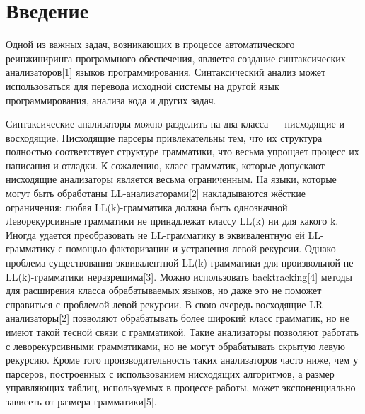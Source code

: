 \documentclass{matmex-diploma-custom}
\begin{document}
\maketitle
\section*{Введение}
Одной из важных задач, возникающих в процессе автоматического реинжиниринга программного обеспечения, является создание синтаксических анализаторов[1] языков программирования. Синтаксический анализ может использоваться для перевода исходной системы на другой язык программирования, анализа кода и других задач.

Синтаксические анализаторы можно разделить на два класса — нисходящие и восходящие. Нисходящие парсеры привлекательны тем, что их структура полностью соответствует структуре грамматики, что весьма упрощает процесс их написания и отладки. К сожалению, класс грамматик, которые допускают нисходящие анализаторы является весьма ограниченным. На языки, которые могут быть обработаны LL-анализаторами[2] накладываются жёсткие ограничения: любая LL(k)-грамматика должна быть однозначной. Леворекурсивные  грамматики не принадлежат классу LL(k) ни для  какого  k. Иногда удается преобразовать не LL-грамматику в эквивалентную ей LL-грамматику с  помощью факторизации  и устранения левой рекурсии. Однако  проблема  существования эквивалентной LL(k)-грамматики для произвольной  не LL(k)-грамматики неразрешима[3]. Можно использовать backtracking[4] методы для расширения класса обрабатываемых языков, но даже это не поможет справиться с проблемой левой рекурсии. В свою очередь восходящие LR-анализаторы[2] позволяют обрабатывать более широкий класс грамматик, но не имеют такой тесной связи с грамматикой. Такие анализаторы позволяют работать с леворекурсивными грамматиками, но не могут обрабатывать скрытую левую рекурсию. Кроме того производительность таких анализаторов часто ниже, чем у парсеров, построенных с использованием нисходящих алгоритмов, а размер управляющих таблиц, используемых в процессе работы, может экспоненциально зависеть от размера грамматики[5].
\end{document}
